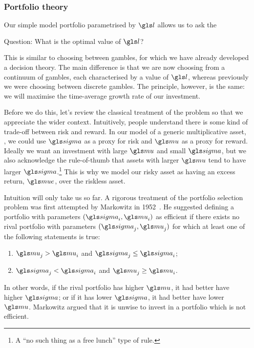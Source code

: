 \subsubsection{Portfolio theory}
Our simple model portfolio parametrised by $\l$ allows us to ask the
\begin{keypts}{Question:}
What is the optimal value of $\l$?
\end{keypts}
This is similar to choosing between gambles, for which we have already developed a decision theory. The main difference is that we are now choosing from a continuum of gambles, each characterised by a value of $\l$, whereas previously we were choosing between discrete gambles. The principle, however, is the same: we will maximise the time-average growth rate of our investment.

Before we do this, let's review the classical treatment of the problem so that we appreciate the wider context. Intuitively, people understand there is some kind of trade-off between risk and reward. In our model of a generic multiplicative asset, , we could use $\gsigma$ as a proxy for risk and $\gmu$ as a proxy for reward. Ideally we want an investment with large $\gmu$ and small $\gsigma$, but we also acknowledge the rule-of-thumb that assets with larger $\gmu$ tend to have larger $\gsigma$.\footnote{A ``no such thing as a free lunch'' type of rule.} This is why we model our risky asset as having an excess return, $\mue$, over the riskless asset.

Intuition will only take us so far. A rigorous treatment of the portfolio selection problem was first attempted by Markowitz in 1952~\cite{Markowitz1952}. He suggested defining a portfolio with parameters $(\gsigma_i, \gmu_i)$ as efficient if there exists no rival portfolio with parameters $(\gsigma_j, \gmu_j)$ for which at least one of the following statements is true:
\begin{enumerate}
\item $\gmu_j>\gmu_i$ and $\gsigma_j\leq\gsigma_i$;
\item $\gsigma_j<\gsigma_i$ and $\gmu_j\geq\gmu_i$.
\end{enumerate}
In other words, if the rival portfolio has higher $\gmu$, it had better have higher $\gsigma$; or if it has lower $\gsigma$, it had better have lower $\gmu$. Markowitz argued that it is unwise to invest in a portfolio which is not efficient.

